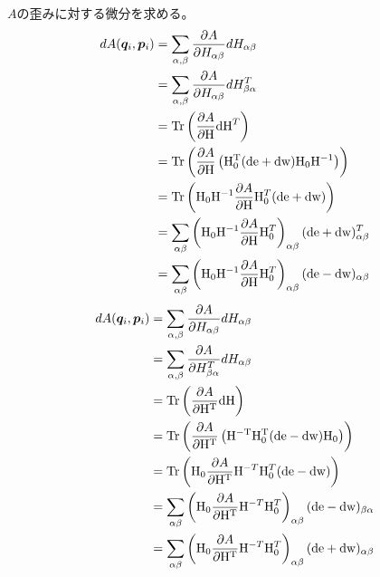 \documentclass[11pt,a4paper,uplatex]{jsarticle}
\begin{document}
$A$の歪みに対する微分を求める。
\begin{align}
    dA({\bm{q}_{i},\bm{p}_{i}}) &= \sum_{\alpha,\beta} \frac{\partial A}{\partial H_{\alpha \beta}} dH_{\alpha \beta} \\
    &= \sum_{\alpha,\beta} \frac{\partial A}{\partial H_{\alpha \beta}} dH_{\beta \alpha}^{T} \\
    &= \mathrm{Tr} \left(\frac{\partial A}{\partial {\rm H}} {\rm dH}^{T} \right) \\
    &= \mathrm{Tr} \left(\frac{\partial A}{\partial {\rm H}} \left(  {\rm H_{0}^{T}}({\rm de + dw}) {\rm H_{0}} {\rm H}^{-1} \right) \right) \\
    &= \mathrm{Tr} \left({\rm H}_{0} {\rm H}^{-1} \frac{\partial A}{\partial {\rm H}} {\rm H}_{0}^{T} ({\rm de + dw}) \right) \\
    &= \sum_{\alpha \beta} \left({\rm H}_{0} {\rm H}^{-1} \frac{\partial A}{\partial {\rm H}} {\rm H}_{0}^{T} \right)_{\alpha \beta} ({\rm de + dw})^{T}_{\alpha \beta}\\
    &= \sum_{\alpha \beta} \left({\rm H}_{0} {\rm H}^{-1} \frac{\partial A}{\partial {\rm H}} {\rm H}_{0}^{T} \right)_{\alpha \beta} ({\rm de - dw})_{\alpha \beta}\\
\end{align}
\begin{align}
    dA({\bm{q}_{i},\bm{p}_{i}}) &= \sum_{\alpha,\beta} \frac{\partial A}{\partial H_{\alpha \beta}} dH_{\alpha \beta} \\
    &= \sum_{\alpha,\beta} \frac{\partial A}{\partial H_{\beta \alpha}^{T}} dH_{\alpha \beta} \\
    &= \mathrm{Tr} \left(\frac{\partial A}{\partial {\rm H^{T}}} {\rm dH} \right) \\
    &= \mathrm{Tr} \left(\frac{\partial A}{\partial {\rm H^{T}}} \left(  {\rm H^{-T} H_{0}^{T}} ({\rm de - dw}) {\rm H_{0}} \right) \right) \\
    &= \mathrm{Tr} \left({\rm H}_{0} \frac{\partial A}{\partial {\rm H^{T}}} {\rm H}^{-T}{\rm H}_{0}^{T} ({\rm de - dw}) \right) \\
    &= \sum_{\alpha \beta}\left({\rm H}_{0} \frac{\partial A}{\partial {\rm H^{T}}} {\rm H}^{-T}{\rm H}_{0}^{T}\right)_{\alpha \beta} ({\rm de - dw})_{\beta \alpha} \\
    &= \sum_{\alpha \beta}\left({\rm H}_{0} \frac{\partial A}{\partial {\rm H^{T}}} {\rm H}^{-T}{\rm H}_{0}^{T}\right)_{\alpha \beta} ({\rm de + dw})_{\alpha \beta} \\
\end{align}
\end{document}
